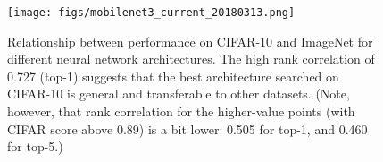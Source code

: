 \documentclass[runningheads]{llncs}
\begin{document}
\begin{figure}[H]
    \centering
    \texttt{[image: figs/mobilenet3\_current\_20180313.png]}
    \caption{
    Relationship between performance on CIFAR-10 and ImageNet for different neural network architectures. The high rank correlation of 0.727 (top-1) suggests that the best architecture searched on CIFAR-10 is general and transferable to other datasets.
(Note, however, that rank correlation for the higher-value points (with CIFAR score above 0.89)
    is a bit lower: 0.505 for top-1, and 0.460 for top-5.)
    }
    \label{fig:cifar-vs-imagenet}
\end{figure}
\end{document}
